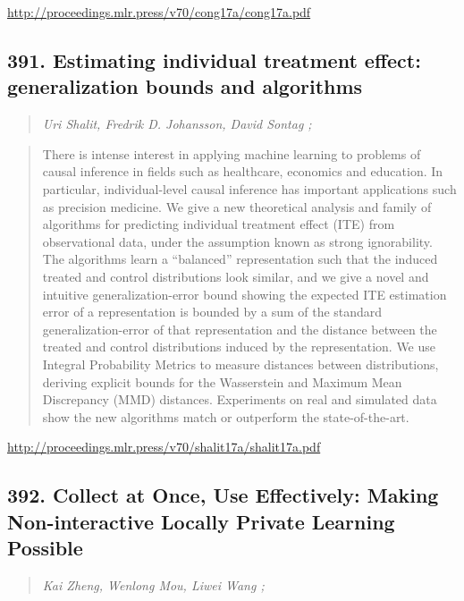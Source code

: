 \documentclass{article}
\begin{document}
\href{http://proceedings.mlr.press/v70/cong17a/cong17a.pdf}{http://proceedings.mlr.press/v70/cong17a/cong17a.pdf}

\subsection{391. Estimating individual treatment effect: generalization bounds and algorithms}

\begin{quote}
\footnotesize{\textit{Uri Shalit, Fredrik D. Johansson, David Sontag ;}}
\end{quote}

\begin{quote}
    There is intense interest in applying machine learning to problems of causal inference in fields such as healthcare, economics and education. In particular, individual-level causal inference has important applications such as precision medicine. We give a new theoretical analysis and family of algorithms for predicting individual treatment effect (ITE) from observational data, under the assumption known as strong ignorability. The algorithms learn a “balanced” representation such that the induced treated and control distributions look similar, and we give a novel and intuitive generalization-error bound showing the expected ITE estimation error of a representation is bounded by a sum of the standard generalization-error of that representation and the distance between the treated and control distributions induced by the representation. We use Integral Probability Metrics to measure distances between distributions, deriving explicit bounds for the Wasserstein and Maximum Mean Discrepancy (MMD) distances. Experiments on real and simulated data show the new algorithms match or outperform the state-of-the-art.  \end{quote}

\href{http://proceedings.mlr.press/v70/shalit17a/shalit17a.pdf}{http://proceedings.mlr.press/v70/shalit17a/shalit17a.pdf}

\subsection{392. Collect at Once, Use Effectively: Making Non-interactive Locally Private Learning Possible}

\begin{quote}
\footnotesize{\textit{Kai Zheng, Wenlong Mou, Liwei Wang ;}}
\end{quote}
\end{document}
